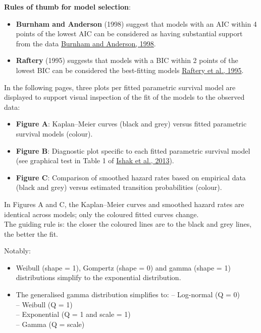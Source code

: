 \documentclass[
]{article}
\providecommand{\tightlist}{%
  \setlength{\itemsep}{0pt}\setlength{\parskip}{0pt}}
\begin{document}
\textbf{Rules of thumb for model selection}:

\begin{itemize}
\tightlist
\item
  \textbf{Burnham and Anderson} (1998) suggest that models with an AIC
  within 4 points of the lowest AIC can be considered as having
  substantial support from the data
  \href{https://doi.org/10.1007/978-1-4757-2917-7}{Burnham and Anderson,
  1998}.\\
\item
  \textbf{Raftery} (1995) suggests that models with a BIC within 2
  points of the lowest BIC can be considered the best-fitting models
  \href{https://doi.org/10.2307/271063}{Raftery et al., 1995}.
\end{itemize}

In the following pages, three plots per fitted parametric survival model
are displayed to support visual inspection of the fit of the models to
the observed data:

\begin{itemize}
\tightlist
\item
  \textbf{Figure A}: Kaplan--Meier curves (black and grey) versus fitted
  parametric survival models (colour).\\
\item
  \textbf{Figure B}: Diagnostic plot specific to each fitted parametric
  survival model (see graphical test in Table 1 of
  \href{https://doi.org/10.1007/s40273-013-0064-3}{Ishak et al., 2013}).
\item
  \textbf{Figure C}: Comparison of smoothed hazard rates based on
  empirical data (black and grey) versus estimated transition
  probabilities (colour).
\end{itemize}

In Figures A and C, the Kaplan--Meier curves and smoothed hazard rates
are identical across models; only the coloured fitted curves change.\\
The guiding rule is: the closer the coloured lines are to the black and
grey lines, the better the fit.

Notably:

\begin{itemize}
\tightlist
\item
  Weibull (shape = 1), Gompertz (shape = 0) and gamma (shape = 1)
  distributions simplify to the exponential distribution.\\
\item
  The generalised gamma distribution simplifies to: -- Log-normal (Q =
  0)\\
  -- Weibull (Q = 1)\\
  -- Exponential (Q = 1 and scale = 1)\\
  -- Gamma (Q = scale)
\end{itemize}
\end{document}
